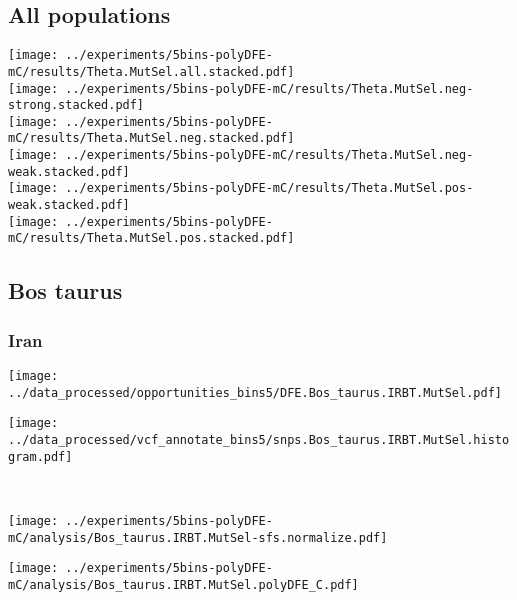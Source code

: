 \subsection{All populations}
\begin{center}
    \texttt{[image: ../experiments/5bins-polyDFE-mC/results/Theta.MutSel.all.stacked.pdf]} \\
    \texttt{[image: ../experiments/5bins-polyDFE-mC/results/Theta.MutSel.neg-strong.stacked.pdf]} \\
    \texttt{[image: ../experiments/5bins-polyDFE-mC/results/Theta.MutSel.neg.stacked.pdf]} \\
    \texttt{[image: ../experiments/5bins-polyDFE-mC/results/Theta.MutSel.neg-weak.stacked.pdf]} \\
    \texttt{[image: ../experiments/5bins-polyDFE-mC/results/Theta.MutSel.pos-weak.stacked.pdf]} \\
    \texttt{[image: ../experiments/5bins-polyDFE-mC/results/Theta.MutSel.pos.stacked.pdf]}
\end{center}

\subsection{Bos taurus}

\subsubsection{Iran}

\begin{minipage}{0.49\linewidth}
    \texttt{[image: ../data\_processed/opportunities\_bins5/DFE.Bos\_taurus.IRBT.MutSel.pdf]}
\end{minipage}
\begin{minipage}{0.49\linewidth}
    \texttt{[image: ../data\_processed/vcf\_annotate\_bins5/snps.Bos\_taurus.IRBT.MutSel.histogram.pdf]}
\end{minipage}
\\
\begin{minipage}{0.49\linewidth}
    \texttt{[image: ../experiments/5bins-polyDFE-mC/analysis/Bos\_taurus.IRBT.MutSel-sfs.normalize.pdf]}
\end{minipage}
\begin{minipage}{0.49\linewidth}
    \texttt{[image: ../experiments/5bins-polyDFE-mC/analysis/Bos\_taurus.IRBT.MutSel.polyDFE\_C.pdf]}
\end{minipage}
\\


